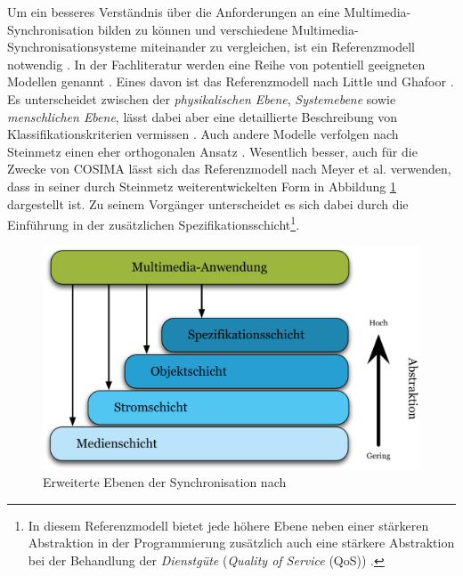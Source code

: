   Um ein besseres Verständnis über die Anforderungen an eine Multimedia-Synchronisation bilden zu können und verschiedene Multimedia-Synchronisationsysteme miteinander zu vergleichen, ist ein Referenzmodell notwendig \citep[S. 601]{multimedia_technologie}. In der Fachliteratur werden eine Reihe von potentiell geeigneten Modellen genannt \citep[S. 601]{multimedia_technologie}. Eines davon ist das Referenzmodell nach Little und Ghafoor \citep{little1991ms}. Es unterscheidet zwischen der \emph{physikalischen Ebene}, \emph{Systemebene} sowie \emph{menschlichen Ebene}, lässt dabei aber eine detaillierte Beschreibung von Klassifikationskriterien vermissen \citep[S. 601]{multimedia_technologie}. Auch andere Modelle verfolgen nach Steinmetz einen eher orthogonalen Ansatz \citep[S. 601]{multimedia_technologie}. Wesentlich besser, auch für die Zwecke von COSIMA lässt sich das Referenzmodell nach Meyer et al. \citep{meyer1993tms} verwenden, dass in seiner durch Steinmetz weiterentwickelten Form \citep{steinmetz1995mcc} in Abbildung \ref{fig:images_Erweiterte_Synchronisations-Ebenen} dargestellt ist. Zu seinem Vorgänger unterscheidet es sich dabei durch die Einführung in der zusätzlichen Spezifikationsschicht\footnote{In diesem Referenzmodell bietet jede höhere Ebene neben einer stärkeren Abstraktion in der Programmierung zusätzlich auch eine stärkere Abstraktion bei der Behandlung der \emph{Dienstgüte} (\emph{Quality of Service} (QoS)) \citep[S. 601]{steinmetz1995mcc}.}.

  \begin{figure}[!ht]
    \centering
      \includegraphics[width=.9\textwidth]{images/Erweiterte_Synchronisations-Ebenen.pdf}
    \caption{Erweiterte Ebenen der Synchronisation nach \citep[S. 601]{steinmetz1995mcc}}
    \label{fig:images_Erweiterte_Synchronisations-Ebenen}
  \end{figure}
  

